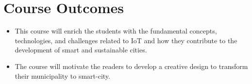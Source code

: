 
\section{Course Outcomes}

\begin{itemize}
\item This course will enrich the students with the fundamental concepts, technologies, and challenges related to IoT and how they contribute to the development of smart and sustainable cities. 
\item The course will motivate the readers to develop a creative design to transform their municipality to smart-city.
\end{itemize}
